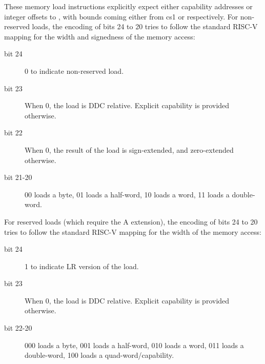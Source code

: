 {		


		\vspace{1.5ex}






		\rvcheriheader










These memory load instructions explicitly expect either capability addresses
or integer offsets to \DDC{}, with bounds coming either from cs1 or \DDC{}
respectively. For non-reserved loads, the encoding of bits 24 to 20 tries to
follow the standard RISC-V mapping for the width and signedness of the memory
access:
\begin{description}
\item [bit 24] 0 to indicate non-reserved load.
\item [bit 23] When 0, the load is DDC relative. Explicit capability is provided otherwise.
\item [bit 22] When 0, the result of the load is sign-extended, and zero-extended otherwise.
\item [bit 21-20] 00 loads a byte, 01 loads a half-word, 10 loads a word, 11 loads a double-word.
\end{description}

For reserved loads (which require the A extension), the encoding of bits 24 to
20 tries to follow the standard RISC-V mapping for the width of the memory
access:
\begin{description}
\item [bit 24] 1 to indicate LR version of the load.
\item [bit 23] When 0, the load is DDC relative. Explicit capability is provided otherwise.
\item [bit 22-20] 000 loads a byte, 001 loads a half-word, 010 loads a word, 011 loads a double-word, 100 loads a quad-word/capability.
\end{description}

}
